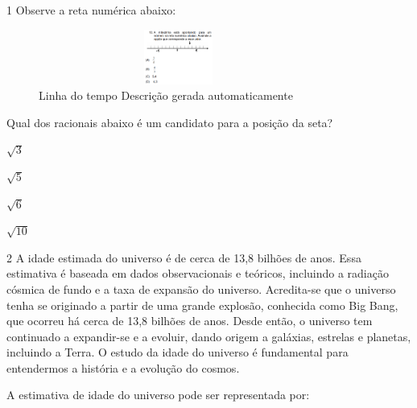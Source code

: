 {{{\begin{escolha}
{{{{\begin{escolha}
\begin{escolha}
{\num{1} Observe a reta numérica abaixo:

\begin{figure}
\centering
\includegraphics[width=3.60725in,height=0.70833in]{./_SAEB_9_MAT/media/image250.png}
\caption{Linha do tempo Descrição gerada automaticamente}
\end{figure}


Qual dos racionais abaixo é um candidato para a posição da seta?


\begin{escolha}

  \item $\sqrt{3}$

  \item $\sqrt{5}$

  \item $\sqrt{6}$

  \item $\sqrt{10}$


\end{escolha}


\num{2} A idade estimada do universo é de cerca de 13,8 bilhões de anos. Essa
estimativa é baseada em dados observacionais e teóricos, incluindo a
radiação cósmica de fundo e a taxa de expansão do universo.
Acredita-se que o universo tenha se originado a partir de uma grande
explosão, conhecida como Big Bang, que ocorreu há cerca de 13,8
bilhões de anos. Desde então, o universo tem continuado a expandir-se
e a evoluir, dando origem a galáxias, estrelas e planetas, incluindo a
Terra. O estudo da idade do universo é fundamental para entendermos a
história e a evolução do cosmos.

A estimativa de idade do universo pode ser representada por:

\begin{escolha}


\end{escolha}}
\end{escolha}
\end{escolha}}}}}
\end{escolha}}}}
